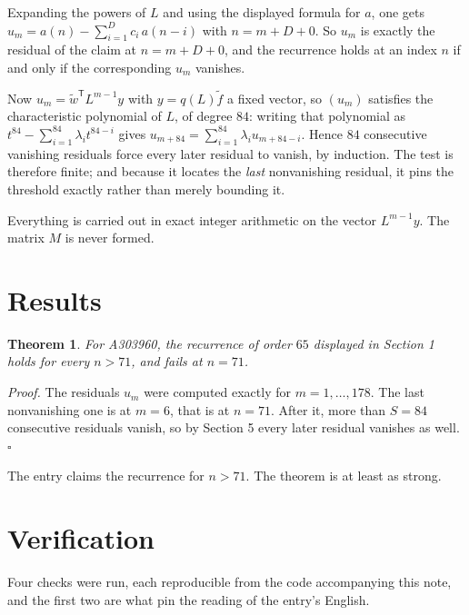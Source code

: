 \documentclass[11pt]{article}
\newtheorem{theorem}{Theorem}
\theoremstyle{definition}
\begin{document}
Expanding the powers of $L$ and using the displayed formula for $a$, one gets $u_m = a(n) - \sum_{i=1}^{D} c_i\,a(n-i)$ with $n = m + D + 0$. So $u_m$ is exactly the residual of the claim at $n = m + D + 0$, and the recurrence holds at an index $n$ if and only if the corresponding $u_m$ vanishes.

Now $u_m = \tilde w^{\mathsf T} L^{m-1} y$ with $y = q(L)\tilde f$ a fixed vector, so $(u_m)$ satisfies the characteristic polynomial of $L$, of degree $84$: writing that polynomial as $t^{84} - \sum_{i=1}^{84} \lambda_i t^{84-i}$ gives $u_{m+84} = \sum_{i=1}^{84} \lambda_i u_{m+84-i}$. Hence $84$ consecutive vanishing residuals force every later residual to vanish, by induction. The test is therefore finite; and because it locates the {\itshape last} nonvanishing residual, it pins the threshold exactly rather than merely bounding it.

Everything is carried out in exact integer arithmetic on the vector $L^{m-1}y$. The matrix $M$ is never formed.

\section{Results}

\begin{theorem} For A303960, the recurrence of order $65$ displayed in Section 1 holds for every $n > 71$, and fails at $n = 71$.\end{theorem}

{\itshape Proof.} The residuals $u_m$ were computed exactly for $m = 1,\dots,178$. The last nonvanishing one is at $m = 6$, that is at $n = 71$. After it, more than $S = 84$ consecutive residuals vanish, so by Section 5 every later residual vanishes as well. $\square$

The entry claims the recurrence for $n > 71$. The theorem is at least as strong.

\section{Verification}

Four checks were run, each reproducible from the code accompanying this note, and the first two are what pin the reading of the entry's English.
\end{document}
